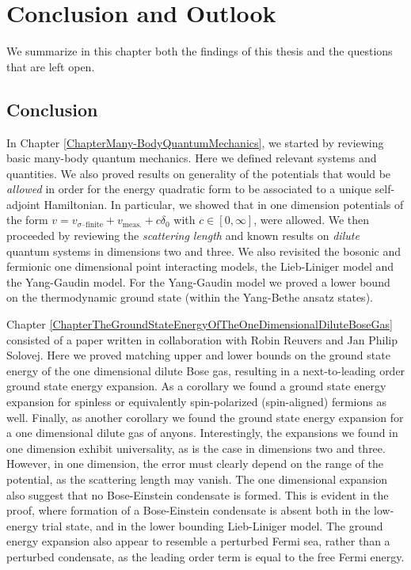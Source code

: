 \chapter{Conclusion and Outlook}
\label{ChapterConclusionAndOutlook}
We summarize in this chapter both the findings of this thesis and the questions that are left open.
\section{Conclusion}
In Chapter \ref{ChapterMany-BodyQuantumMechanics}, we started by reviewing basic many-body quantum mechanics. Here we defined relevant systems and quantities. We also proved results on generality of the potentials that would be \emph{allowed} in order for the energy quadratic form to be associated to a unique self-adjoint Hamiltonian. In particular, we showed that in one dimension potentials of the form $ v=v_{\sigma\text{--finite}}+v_{\text{meas.}} +c\delta_0 $ with $ c\in[0,\infty] $, were allowed. We then proceeded by reviewing the \emph{scattering length} and known results on \emph{dilute} quantum systems in dimensions two and three. We also revisited the bosonic and fermionic one dimensional point interacting models, \ie the Lieb-Liniger model and the Yang-Gaudin model.
For the Yang-Gaudin model we proved a lower bound on the thermodynamic ground state (within the Yang-Bethe ansatz states).

Chapter \ref{ChapterTheGroundStateEnergyOfTheOneDimensionalDiluteBoseGas} consisted of a paper written in collaboration with Robin Reuvers and Jan Philip Solovej. Here we proved matching upper and lower bounds on the ground state energy of the one dimensional dilute Bose gas, resulting in a next-to-leading order ground state energy expansion. As a corollary we found a ground state energy expansion for spinless or equivalently spin-polarized (spin-aligned) fermions as well. Finally, as  another corollary we found the ground state energy expansion for a one dimensional dilute gas of anyons. Interestingly, the expansions we found in one dimension exhibit universality, as is the case in dimensions two and three. However, in one dimension, the error must clearly depend on the range of the potential, as the scattering length may vanish. The one dimensional expansion also suggest that no Bose-Einstein condensate is formed. This is evident in the proof, where formation of a Bose-Einstein condensate is absent both in the low-energy trial state, and in the lower bounding Lieb-Liniger model. The ground energy expansion also appear to resemble a perturbed Fermi sea, rather than a perturbed condensate, as the leading order term is equal to the free Fermi energy.

